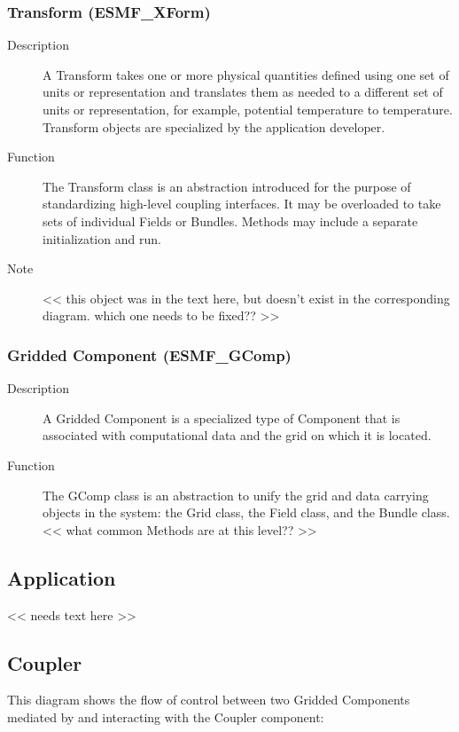 \subsubsection{Transform (ESMF\_XForm)} 
\begin{description}
\item [Description] A Transform takes one or more physical quantities defined using one set 
of units or representation and translates them as needed to a different set of units or 
representation, for example, potential temperature to temperature.  Transform objects 
are specialized by the application developer.
\item [Function] The Transform class is an abstraction introduced for the
purpose of standardizing high-level coupling interfaces.  It may be overloaded
to take sets of individual Fields or Bundles.  Methods may include a
separate initialization and run. 
\item [Note] << this object was in the text here, but doesn't
exist in the corresponding diagram.  which one needs to be fixed?? >>
\end{description}

\subsubsection{Gridded Component (ESMF\_GComp)}
\label{sec:griddedcomponent} 
\begin{description}
\item [Description] A Gridded Component is a specialized type of Component that is associated
with computational data and the grid on which it is located.
\item [Function] The GComp class is an abstraction to unify the grid and data carrying
objects in the system: the Grid class, the Field class, and the Bundle class.
<< what common Methods are at this level?? >>
\end{description}


\subsection{Application}

<< needs text here >>

\subsection{Coupler}

This diagram shows the flow of control between two Gridded Components
mediated by and interacting with the Coupler component: 

